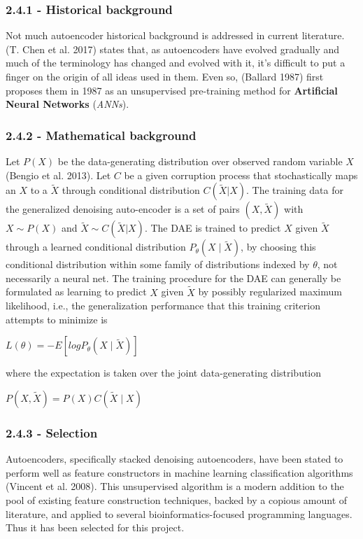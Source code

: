 \documentclass[]{article}
\begin{document}
\subsubsection{2.4.1 - Historical
background}\label{historical-background-3}

Not much autoencoder historical background is addressed in current
literature. (T. Chen et al. 2017) states that, as autoencoders have
evolved gradually and much of the terminology has changed and evolved
with it, it's difficult to put a finger on the origin of all ideas used
in them. Even so, (Ballard 1987) first proposes them in 1987 as an
unsupervised pre-training method for \textbf{Artificial Neural Networks}
(\emph{ANNs}).

\subsubsection{2.4.2 - Mathematical
background}\label{mathematical-background-3}

Let \(P(X)\) be the data-generating distribution over observed random
variable \(X\) (Bengio et al. 2013). Let \(C\) be a given corruption
process that stochastically maps an \(X\) to a \(\tilde{X}\) through
conditional distribution \(C(\tilde{X}|X)\). The training data for the
generalized denoising auto-encoder is a set of pairs \((X, \tilde{X})\)
with \(X \sim P(X)\) and \(\tilde{X} \sim C(\tilde{X}|X)\). The DAE is
trained to predict \(X\) given \(\tilde{X}\) through a learned
conditional distribution \(P_\theta(X \mid \tilde{X})\), by choosing
this conditional distribution within some family of distributions
indexed by \(\theta\), not necessarily a neural net. The training
procedure for the DAE can generally be formulated as learning to predict
\(X\) given \(\tilde{X}\) by possibly regularized maximum likelihood,
i.e., the generalization performance that this training criterion
attempts to minimize is

\(L(\theta) = -E[log P_\theta(X\mid\tilde{X})]\)

where the expectation is taken over the joint data-generating
distribution

\(P(X, \tilde{X}) = P(X) C (\tilde{X} \mid X)\)

\subsubsection{2.4.3 - Selection}\label{selection-2}

Autoencoders, specifically stacked denoising autoencoders, have been
stated to perform well as feature constructors in machine learning
classification algorithms (Vincent et al. 2008). This unsupervised
algorithm is a modern addition to the pool of existing feature
construction techniques, backed by a copious amount of literature, and
applied to several bioinformatics-focused programming languages. Thus it
has been selected for this project.
\end{document}
